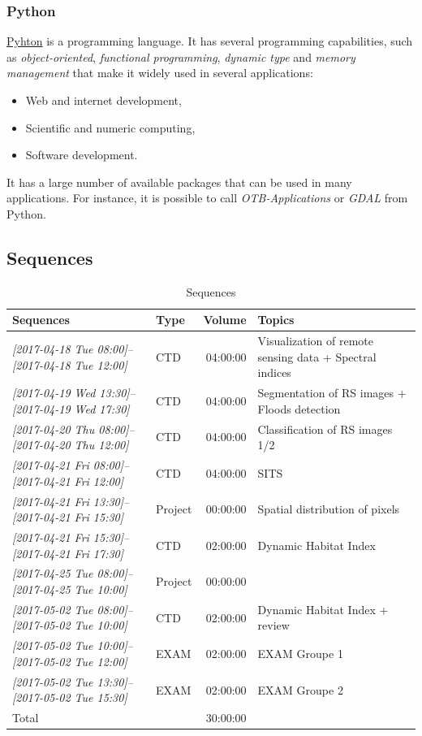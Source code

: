 \documentclass[a4paper,11pt,DIV=18]{scrartcl}
\begin{document}
\subsubsection{Python}
\label{sec:orgb0dccb6}
\href{https://www.python.org/}{Pyhton}  is   a  programming  language.  It   has  several  programming
capabilities, such as \emph{object-oriented}, \emph{functional programming}, \emph{dynamic
type}  and  \emph{memory management}  that  make  it  widely used  in  several
applications:
\begin{itemize}
\item Web and internet development,
\item Scientific and numeric computing,
\item Software development.
\end{itemize}
It has a large  number of available packages that can  be used in many
applications. For instance, it is possible to call \emph{OTB-Applications} or
\emph{GDAL} from Python.
\subsection{Sequences}
\label{sec:org95c2b49}

\begin{table}[htbp]
\caption{Sequences}
\centering
\begin{tabular}{llrl}
\toprule
Sequences & Type & Volume & Topics\\
\midrule
\textit{[2017-04-18 Tue 08:00]--[2017-04-18 Tue 12:00]} & CTD & 04:00:00 & Visualization of remote sensing data + Spectral indices\\
\textit{[2017-04-19 Wed 13:30]--[2017-04-19 Wed 17:30]} & CTD & 04:00:00 & Segmentation of RS images + Floods detection\\
\textit{[2017-04-20 Thu 08:00]--[2017-04-20 Thu 12:00]} & CTD & 04:00:00 & Classification of RS images 1/2\\
\textit{[2017-04-21 Fri 08:00]--[2017-04-21 Fri 12:00]} & CTD & 04:00:00 & SITS\\
\textit{[2017-04-21 Fri 13:30]--[2017-04-21 Fri 15:30]} & Project & 00:00:00 & Spatial distribution of pixels\\
\textit{[2017-04-21 Fri 15:30]--[2017-04-21 Fri 17:30]} & CTD & 02:00:00 & Dynamic Habitat Index\\
\textit{[2017-04-25 Tue 08:00]--[2017-04-25 Tue 10:00]} & Project & 00:00:00 & \\
\textit{[2017-05-02 Tue 08:00]--[2017-05-02 Tue 10:00]} & CTD & 02:00:00 & Dynamic Habitat Index + review\\
\textit{[2017-05-02 Tue 10:00]--[2017-05-02 Tue 12:00]} & EXAM & 02:00:00 & EXAM Groupe 1\\
\textit{[2017-05-02 Tue 13:30]--[2017-05-02 Tue 15:30]} & EXAM & 02:00:00 & EXAM Groupe 2\\
\midrule
Total &  & 30:00:00 & \\
\bottomrule
\end{tabular}
\end{table}
\end{document}
